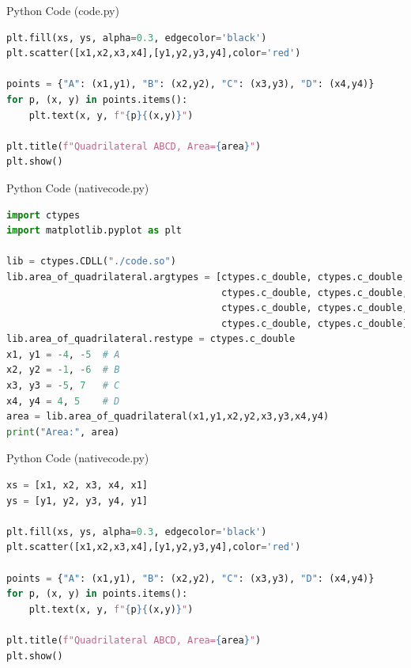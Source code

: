 \documentclass{beamer}
\begin{document}
\begin{frame}[fragile]{Python Code (code.py)}
\begin{lstlisting}[language=Python]
plt.fill(xs, ys, alpha=0.3, edgecolor='black')
plt.scatter([x1,x2,x3,x4],[y1,y2,y3,y4],color='red')

points = {"A": (x1,y1), "B": (x2,y2), "C": (x3,y3), "D": (x4,y4)}
for p, (x, y) in points.items():
    plt.text(x, y, f"{p}{(x,y)}")

plt.title(f"Quadrilateral ABCD, Area={area}")
plt.show()
\end{lstlisting}
\end{frame}
\begin{frame}[fragile]{Python Code (nativecode.py)}
\begin{lstlisting}[language=Python]
import ctypes
import matplotlib.pyplot as plt

lib = ctypes.CDLL("./code.so")
lib.area_of_quadrilateral.argtypes = [ctypes.c_double, ctypes.c_double,
                                      ctypes.c_double, ctypes.c_double,
                                      ctypes.c_double, ctypes.c_double,
                                      ctypes.c_double, ctypes.c_double]
lib.area_of_quadrilateral.restype = ctypes.c_double
x1, y1 = -4, -5  # A
x2, y2 = -1, -6  # B
x3, y3 = -5, 7   # C
x4, y4 = 4, 5    # D
area = lib.area_of_quadrilateral(x1,y1,x2,y2,x3,y3,x4,y4)
print("Area:", area)
\end{lstlisting}
\end{frame}
\begin{frame}[fragile]{Python Code (nativecode.py)}
\begin{lstlisting}[language=Python]
xs = [x1, x2, x3, x4, x1]
ys = [y1, y2, y3, y4, y1]

plt.fill(xs, ys, alpha=0.3, edgecolor='black')
plt.scatter([x1,x2,x3,x4],[y1,y2,y3,y4],color='red')

points = {"A": (x1,y1), "B": (x2,y2), "C": (x3,y3), "D": (x4,y4)}
for p, (x, y) in points.items():
    plt.text(x, y, f"{p}{(x,y)}")

plt.title(f"Quadrilateral ABCD, Area={area}")
plt.show()
\end{lstlisting}
\end{frame}
\end{document}
